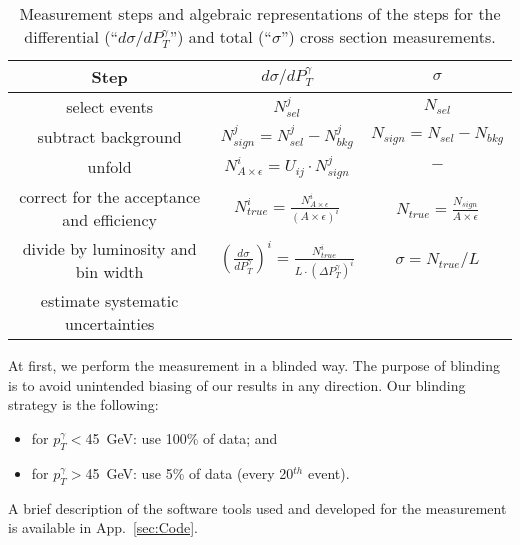 \begin{table}[h]
  \small
  \begin{center}
  \caption{Measurement steps and algebraic representations of the steps for the differential (``$d\sigma/dP_{T}^{\gamma}$'') and total (``$\sigma$'') cross section measurements. }
  \begin{tabular}{|c|c|c|}
    \hline
    Step & $d\sigma/dP_{T}^{\gamma}$ & $\sigma$ \\ \hline
    select events & $N_{sel}^j$ &    $N_{sel}$       \\ \hline
    subtract background & $N_{sign}^j = N_{sel}^j - N_{bkg}^j$ &    $N_{sign}=N_{sel}-N_{bkg}$       \\ \hline
    unfold   & $N_{A\times\epsilon}^i = U_{ij} \cdot N_{sign}^j$ &    $-$       \\ \hline
    correct for the acceptance and efficiency & $N_{true}^i = \frac{N_{A\times\epsilon}^i}{(A \times\epsilon)^i}$ &  $N_{true}=\frac{N_{sign}}{A\times\epsilon}$       \\ \hline
    divide by luminosity and bin width & $ \left( \frac{d\sigma}{dP_{T}^\gamma} \right) ^i = \frac{N_{true}^i}{L \cdot (\Delta P_T^\gamma)^i}$  &  $\sigma = N_{true}/L$       \\ \hline
    estimate systematic uncertainties &  &         \\ \hline
  \end{tabular}
  \label{tab:analysisOutline}
  \end{center}
\end{table}

At first, we perform the measurement in a blinded way. The purpose of blinding is to avoid unintended biasing of our results in any direction. Our blinding strategy is the following:
\begin{itemize}
  \item for $p_T^{\gamma}<$45~GeV: use 100\% of data; and
  \item for $p_T^{\gamma}>$45~GeV: use 5\% of data (every 20$^{th}$ event).
\end{itemize}


A brief description of the software tools used and developed for the measurement is available in App.~\ref{sec:Code}.
